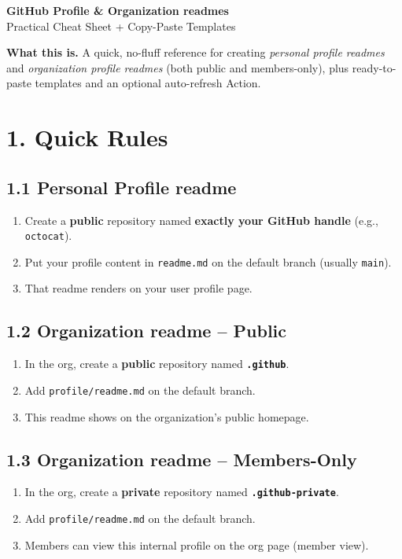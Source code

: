 \documentclass[11pt]{article}
\renewcommand{\kbd}[1]{\texttt{#1}}
\begin{document}
\begin{center}
  {\LARGE \textbf{GitHub Profile \& Organization readmes}}\\[4pt]
  {\large Practical Cheat Sheet + Copy-Paste Templates}
\end{center}

\vspace{0.5em}

\begin{tcolorbox}
\textbf{What this is.} A quick, no-fluff reference for creating \emph{personal profile readmes} and \emph{organization profile readmes} (both public and members-only), plus ready-to-paste templates and an optional auto-refresh Action.
\end{tcolorbox}

\section*{1. Quick Rules}

\subsection*{1.1 Personal Profile readme}
\begin{enumerate}
  \item Create a \textbf{public} repository named \textbf{exactly your GitHub handle} (e.g., \kbd{octocat}).
  \item Put your profile content in \kbd{readme.md} on the default branch (usually \kbd{main}).
  \item That readme renders on your user profile page.
\end{enumerate}

\subsection*{1.2 Organization readme -- Public}
\begin{enumerate}
  \item In the org, create a \textbf{public} repository named \textbf{\kbd{.github}}.
  \item Add \kbd{profile/readme.md} on the default branch.
  \item This readme shows on the organization's public homepage.
\end{enumerate}

\subsection*{1.3 Organization readme -- Members-Only}
\begin{enumerate}
  \item In the org, create a \textbf{private} repository named \textbf{\kbd{.github-private}}.
  \item Add \kbd{profile/readme.md} on the default branch.
  \item Members can view this internal profile on the org page (member view).
\end{enumerate}
\end{document}
